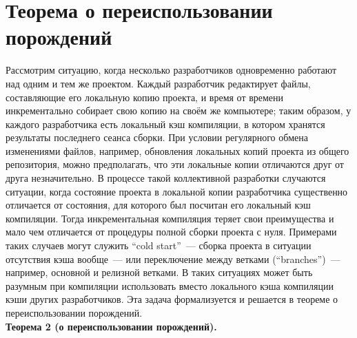 \newpage
\section{Теорема о переиспользовании порождений}

Рассмотрим ситуацию, когда несколько разработчиков одновременно работают над одним и тем же проектом. Каждый разработчик редактирует файлы, составляющие его локальную копию проекта, и время от времени инкрементально собирает свою копию на своём же компьютере; таким образом, у каждого разработчика есть локальный кэш компиляции, в котором хранятся результаты последнего сеанса сборки. При условии регулярного обмена изменениями файлов, например, обновления локальных копий проекта из общего репозитория, можно предполагать, что эти локальные копии отличаются друг от друга незначительно. В процессе такой коллективной разработки случаются ситуации, когда состояние проекта в локальной копии разработчика существенно отличается от состояния, для которого был посчитан его локальный кэш компиляции. Тогда инкрементальная компиляция теряет свои преимущества и мало чем отличается от процедуры полной сборки проекта с нуля. Примерами таких случаев могут служить ``cold start''~--- сборка проекта в ситуации отсутствия кэша вообще~--- или переключение между ветками (``branches'')~--- например, основной и релизной ветками. В таких ситуациях может быть разумным при компиляции использовать вместо локального кэша компиляции кэши других разработчиков. Эта задача формализуется и решается в теореме о переиспользовании порождений.\\

\textbf{Теорема 2 (о переиспользовании порождений).}

\newcommand{\sigi}{{\sigma_i}}
\newcommand{\sigk}{{\sigma_k}}
\newcommand{\sigpi}{{\sigma^\prime_i}}
\newcommand{\sigpj}{{\sigma^\prime_j}}
\newcommand{\sigpk}{{\sigma^\prime_k}}
\newcommand{\parti}{{\partial_i}}
\newcommand{\partj}{{\partial_j}}
\newcommand{\partk}{{\partial_k}}
\newcommand{\xii}{{\xi_i}}
\newcommand{\xij}{{\xi_j}}
\newcommand{\xik}{{\xi_k}}
\newcommand{\sms}{{\setminus}}
\newcommand{\alloth}{\bigcup\limits_{j \neq i}\omega^\prime_j}
\newcommand{\allothk}{\bigcup\limits_{j \neq k}\omega^\prime_j}
\newcommand{\allothD}{\bigcup\limits_{j \neq i}\omega^\Delta_{\sigpj}}
\newcommand{\rprt}{{\text{п.ч.}}}

